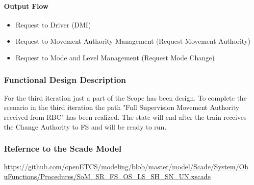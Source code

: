 \paragraph{Output Flow}
\begin{itemize}
\item Request to Driver (DMI)
\item Request to Movement Authority Management (Request Movement Authority)
\item Request to Mode and Level Management (Request Mode Change)
\end{itemize}


\subsubsection{Functional Design Description}
For the third iteration just a part of the Scope has been design. To complete the scenario in the third iteration the path "Full Supervision Movement Authority received from RBC" has been realized. The state will end after the train receives the Change Authority to FS and will be ready to run.

\subsubsection{Refernce to the Scade Model}
\url{https://github.com/openETCS/modeling/blob/master/model/Scade/System/ObuFunctions/Procedures/SoM_SR_FS_OS_LS_SH_SN_UN.xscade}

